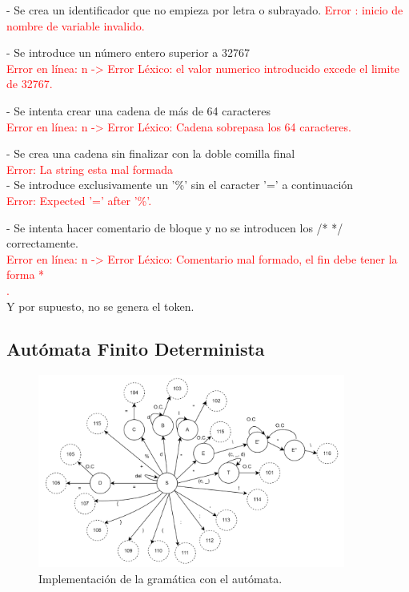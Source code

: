 \documentclass{article}[a4paper]
\newcommand\tab[1][1cm]{\hspace*{#1}}
\begin{document}
- Se crea un identificador que no empieza por letra o subrayado.
\tab \tab \textcolor{red}{Error : inicio de nombre de variable invalido.}

- Se introduce un número entero superior a 32767\\
\tab \tab \textcolor{red}{Error en línea: n -> Error Léxico: el valor numerico introducido excede el limite de 32767.}

- Se intenta crear una cadena de más de 64 caracteres\\
\tab \tab \textcolor{red}{Error en línea: n -> Error Léxico: Cadena sobrepasa los 64 caracteres.}

- Se crea una cadena sin finalizar con la doble comilla final\\
\tab \tab \textcolor{red}{Error: La string esta mal formada}\\

- Se introduce exclusivamente un '\%' sin el caracter '=' a continuación\\
\tab \tab \textcolor{red}{Error: Expected '=' after '\%'.}

- Se intenta hacer comentario de bloque y no se introducen los /* */ correctamente.\\
\tab \tab \textcolor{red}{Error en línea: n -> Error Léxico: Comentario mal formado, el fin debe tener la forma *\\.}\\

Y por supuesto, no se genera el token.

\subsection{Autómata Finito Determinista}
\begin{figure}[h!]
\centering
\includegraphics[width=0.9\textwidth]{automataAnLex.png}
\caption{\label{figura:automata}Implementación de la gramática con el autómata.}
\end{figure}
\end{document}
